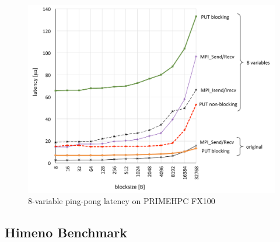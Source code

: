 \begin{figure}
  \begin{center}
    \mbox{\includegraphics[scale=0.45]{graphs/8var-latency-2.pdf}}
    \caption{8-variable ping-pong latency on PRIMEHPC FX100}\label{fig:8var-pingpong}
   \end{center}
\end{figure}
    




\subsection{Himeno Benchmark}


